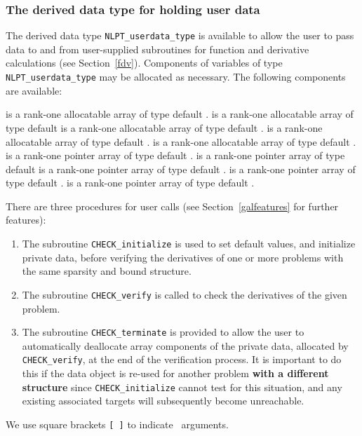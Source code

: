 \documentclass{galahad}
\newcommand{\packagename}{CHECK}
\begin{document}

\subsubsection{The derived data type for holding user data}\label{typeuserdata}
The derived data type 
{\tt NLPT\_userdata\_type} 
is available to allow the user to pass data to and from user-supplied 
subroutines for function and derivative calculations (see Section~\ref{fdv}).
Components of variables of type {\tt NLPT\_userdata\_type} may be allocated as
necessary. The following components are available:

\begin{description}
 is a rank-one allocatable array of type default \integer.
 is a rank-one allocatable array of type default  \realdp
{} is a rank-one allocatable array of type default \complexdp.
 is a rank-one allocatable array of type default \character.
 is a rank-one allocatable array of type default \logical.
 is a rank-one pointer array of type default \integer.
 is a rank-one pointer array of type default  \realdp
{} is a rank-one pointer array of type default \complexdp.
 is a rank-one pointer array of type default \character.
 is a rank-one pointer array of type default \logical.
\end{description}


\galarguments
There are three procedures for user calls
(see Section~\ref{galfeatures} for further features): 

\begin{enumerate}
\item The subroutine 
      {\tt \packagename\_initialize} 
      is used to set default values, and initialize private data, 
      before verifying the derivatives of one or more problems with the
      same sparsity and bound structure.
\item The subroutine 
      {\tt \packagename\_verify} 
      is called to check the derivatives of the given problem.
\item The subroutine 
      {\tt \packagename\_terminate} 
      is provided to allow the user to automatically deallocate array 
       components of the private data, allocated by 
       {\tt \packagename\_verify}, 
       at the end of the verification process. 
       It is important to do this if the data object is re-used for another 
       problem {\bf with a different structure}
       since {\tt \packagename\_initialize} cannot test for this situation, 
       and any existing associated targets will subsequently become unreachable.
\end{enumerate}
We use square brackets {\tt [ ]} to indicate \optional\ arguments.
\end{document}
